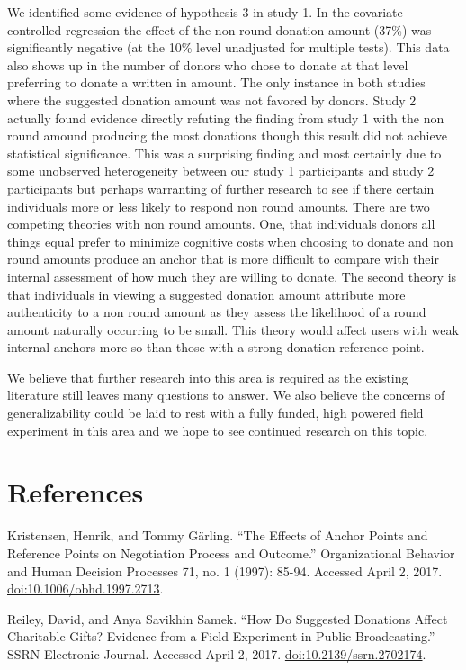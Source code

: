 \documentclass[]{article}
\begin{document}
We identified some evidence of hypothesis 3 in study 1. In the covariate
controlled regression the effect of the non round donation amount (37\%)
was significantly negative (at the 10\% level unadjusted for multiple
tests). This data also shows up in the number of donors who chose to
donate at that level preferring to donate a written in amount. The only
instance in both studies where the suggested donation amount was not
favored by donors. Study 2 actually found evidence directly refuting the
finding from study 1 with the non round amound producing the most
donations though this result did not achieve statistical significance.
This was a surprising finding and most certainly due to some unobserved
heterogeneity between our study 1 participants and study 2 participants
but perhaps warranting of further research to see if there certain
individuals more or less likely to respond non round amounts. There are
two competing theories with non round amounts. One, that individuals
donors all things equal prefer to minimize cognitive costs when choosing
to donate and non round amounts produce an anchor that is more difficult
to compare with their internal assessment of how much they are willing
to donate. The second theory is that individuals in viewing a suggested
donation amount attribute more authenticity to a non round amount as
they assess the likelihood of a round amount naturally occurring to be
small. This theory would affect users with weak internal anchors more so
than those with a strong donation reference point.

We believe that further research into this area is required as the
existing literature still leaves many questions to answer. We also
believe the concerns of generalizability could be laid to rest with a
fully funded, high powered field experiment in this area and we hope to
see continued research on this topic.

\newpage

\section{References}\label{references}

Kristensen, Henrik, and Tommy Gärling. ``The Effects of Anchor Points
and Reference Points on Negotiation Process and Outcome.''
Organizational Behavior and Human Decision Processes 71, no. 1 (1997):
85-94. Accessed April 2, 2017. \url{doi:10.1006/obhd.1997.2713}.

Reiley, David, and Anya Savikhin Samek. ``How Do Suggested Donations
Affect Charitable Gifts? Evidence from a Field Experiment in Public
Broadcasting.'' SSRN Electronic Journal. Accessed April 2, 2017.
\url{doi:10.2139/ssrn.2702174}.
\end{document}
